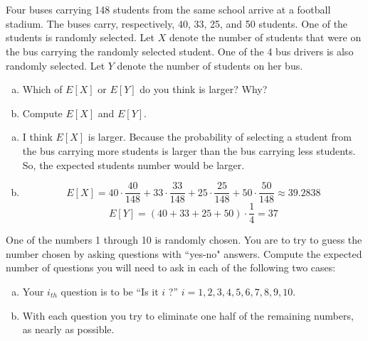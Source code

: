 \documentclass[14pt]{elegantbook}
\begin{document}

\setcounter{chapter}{2}
\chapter{}

    \begin{exercise*}[1]
        Four buses carrying 148 students from the same school arrive at a football stadium. The buses carry, respectively, 40, 33, 25, and 50 students. One of the students is randomly selected. Let $X$ denote the number of students that were on the bus carrying the randomly selected student. One of the 4 bus drivers is also randomly selected. Let $Y$ denote the number of students on her bus. 
        \begin{enumerate}[(a)]
            \item Which of $E[X]$ or $E[Y]$ do you think is larger? Why? 
            \item Compute $E[X]$ and $E[Y]$. 
        \end{enumerate}
    \end{exercise*}

    \begin{solution}
        \begin{enumerate}[(a)]
            \item I think $E[X]$ is larger. Because the probability of selecting a student from the bus carrying more students is larger than the bus carrying less students. So, the expected students number would be larger. 
            \item \[E[X]=40\cdot\frac{40}{148}+33\cdot\frac{33}{148}+25\cdot\frac{25}{148}+50\cdot\frac{50}{148}\approx39.2838\]
            \[E[Y]=(40+33+25+50)\cdot\frac{1}{4}=37\]
        \end{enumerate}
    \end{solution}

    \begin{exercise*}[2]
        One of the numbers 1 through 10 is randomly chosen. You are to try to guess the number chosen by asking questions with ``yes-no" answers. Compute the expected number of questions you will need to ask in each of the following two cases: 
        \begin{enumerate}[(a)]
            \item Your $i_{th}$ question is to be ``Is it $i$ ?'' $i = 1, 2, 3, 4, 5, 6, 7, 8, 9, 10$. 
            \item With each question you try to eliminate one half of the remaining numbers, as nearly 
            as possible. 
        \end{enumerate}
    \end{exercise*}
\end{document}
